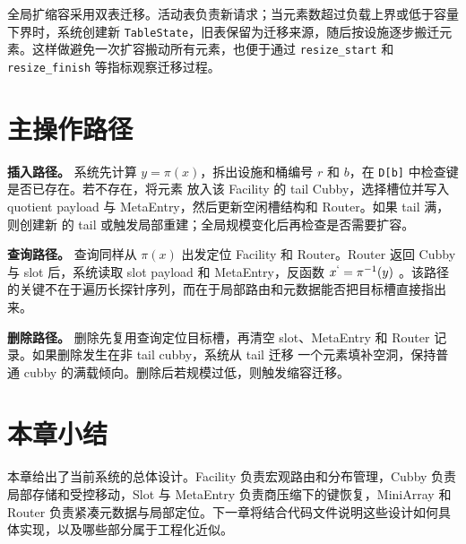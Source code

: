 全局扩缩容采用双表迁移。活动表负责新请求；当元素数超过负载上界或低于容量下界时，系统创建新 \texttt{TableState}，旧表保留为迁移来源，随后按设施逐步搬迁元素。这样做避免一次扩容搬动所有元素，也便于通过 \texttt{resize\_start} 和 \texttt{resize\_finish} 等指标观察迁移过程。

\section{主操作路径}
\textbf{插入路径。} 系统先计算 \(y = \pi(x)\)，拆出设施和桶编号 \(r\) 和 \(b\)，在 \texttt{D[b]} 中检查键是否已存在。若不存在，将元素
放入该 Facility 的 tail Cubby，选择槽位并写入 quotient payload 与 MetaEntry，然后更新空闲槽结构和 Router。如果 tail 满，则创建新
的 tail 或触发局部重建；全局规模变化后再检查是否需要扩容。

\textbf{查询路径。} 查询同样从 \(\pi(x)\) 出发定位 Facility 和 Router。Router 返回 Cubby 与 slot 后，系统读取 slot payload 和 
MetaEntry，反函数 \(x^{`} = \pi^{-1}(y)\) 。该路径的关键不在于遍历长探针序列，而在于局部路由和元数据能否把目标槽直接指出来。

\textbf{删除路径。} 删除先复用查询定位目标槽，再清空 slot、MetaEntry 和 Router 记录。如果删除发生在非 tail cubby，系统从 tail 迁移
一个元素填补空洞，保持普通 cubby 的满载倾向。删除后若规模过低，则触发缩容迁移。

\section{本章小结}
本章给出了当前系统的总体设计。Facility 负责宏观路由和分布管理，Cubby 负责局部存储和受控移动，Slot 与 MetaEntry 负责商压缩下的键恢复，MiniArray 和 Router 负责紧凑元数据与局部定位。下一章将结合代码文件说明这些设计如何具体实现，以及哪些部分属于工程化近似。